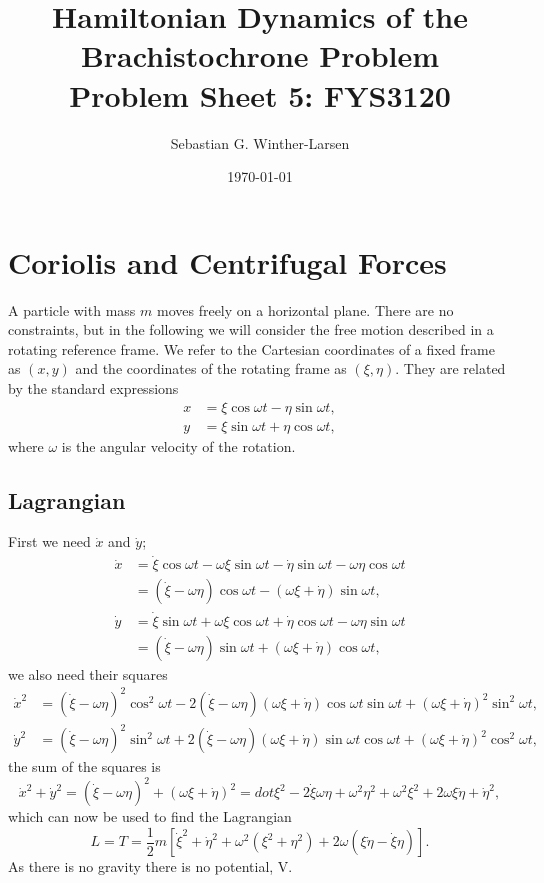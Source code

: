 \documentclass[11pt]{amsart}
\title[Brachistochrone Problem]{Hamiltonian Dynamics of the Brachistochrone Problem\\
	\hrulefill \small{ Problem Sheet 5: FYS3120 } \hrulefill}
\author[Winther-Larsen]{Sebastian G. Winther-Larsen}
\date{\today}
\begin{document}
\maketitle

\section{Coriolis and Centrifugal Forces}
A particle with mass $m$ moves freely on a horizontal plane. There are no constraints, but in the following we will consider the free motion described in a rotating reference frame. We refer to the Cartesian coordinates of a fixed frame as $(x,y)$ and the coordinates of the rotating frame as $(\xi, \eta)$. They are related by the standard expressions
\begin{align}
x &= \xi\cos\omega t - \eta\sin\omega t, \\
y &= \xi\sin\omega t + \eta\cos\omega t,
\end{align}
where $\omega$ is the angular velocity of the rotation.

\subsection{Lagrangian}
First we need $\dot{x}$ and $\dot{y}$;
\begin{align*}
\dot{x} &= \dot{\xi}\cos\omega t - \omega\xi\sin\omega t - \dot{\eta}\sin\omega t - \omega\eta\cos\omega t \\ 
		&= (\dot{\xi} - \omega\eta)\cos\omega t - (\omega\xi + \dot{\eta})\sin\omega t, \\
\dot{y} &= \dot{\xi}\sin\omega t + \omega\xi\cos\omega t + \dot{\eta}\cos\omega t - \omega\eta\sin\omega t \\
 		&= (\dot{\xi} - \omega\eta)\sin\omega t + (\omega\xi + \dot{\eta})\cos\omega t,
\end{align*}
we also need their squares
\begin{align*}
\dot{x}^2 &= (\dot{\xi}-\omega\eta)^2\cos^2\omega t - 2(\dot{\xi}- \omega\eta)(\omega\xi + \dot{\eta})\cos\omega t\sin\omega t + (\omega\xi + \dot{\eta})^2\sin^2\omega t, \\
\dot{y}^2 &= (\dot{\xi}-\omega\eta)^2\sin^2\omega t + 2(\dot{\xi} - \omega\eta)(\omega\xi + \dot{\eta})\sin\omega t \cos\omega t + (\omega\xi + \dot{\eta})^2\cos^2\omega t,
\end{align*}
the sum of the squares is
\begin{equation*}
\dot{x}^2+\dot{y}^2 = (\dot{\xi}-\omega\eta)^2 + (\omega\xi + \dot{\eta})^2 
=dot{\xi}^2 - 2\dot{\xi}\omega\eta + \omega^2\eta^2 + \omega^2\xi^2 + 2\omega\xi\dot{\eta} + \dot{\eta}^2,
\end{equation*}
which can now be used to find the Lagrangian
\begin{equation}
\label{eq:lagrangian1}
L = T = \frac{1}{2}m[\dot{\xi}^2 + \dot{\eta}^2 + \omega^2(\xi^2+\eta^2) + 2\omega(\xi\dot{\eta}- \dot{\xi}\eta)].
\end{equation}
As there is no gravity there is no potential, V.
\end{document}
